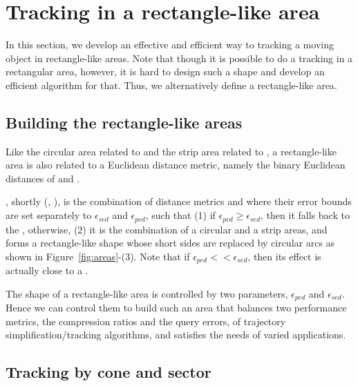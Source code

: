 

\section{Tracking in a rectangle-like area}
\label{sec:rectangle}

In this section, we develop an effective and efficient way to tracking a moving object in rectangle-like areas. Note that though it is possible to do a tracking in a rectangular area, however, it is hard to design such a shape and develop an efficient algorithm for that. Thus, we alternatively define a rectangle-like area.


\subsection{Building the rectangle-like areas}

Like the circular area related to \sed and the strip area related to \ped, a rectangle-like area is also related to a Euclidean distance metric, namely the binary Euclidean distances of \sed and \ped.

, shortly \bed (\sed, \ped), is the combination of distance metrics \sed and \ped where their error bounds are set separately to $\epsilon_{sed}$ and $\epsilon_{ped}$, such that (1) if $\epsilon_{ped} \ge \epsilon_{sed}$, then it falls back to the \sed, otherwise, (2) it is the combination of a circular and a strip areas, and forms a rectangle-like shape whose short sides are replaced by circular arcs as shown in {Figure~\ref{fig:areas}-(3)}. Note that if $\epsilon_{ped} << \epsilon_{sed}$, then its effect is actually close to a \ped.


The shape of a rectangle-like area is controlled by two parameters, $\epsilon_{ped}$ and $\epsilon_{sed}$. Hence we can control them to build such an area that balances two performance metrics, the compression ratios and the query errors, of trajectory simplification/tracking algorithms, and satisfies the needs of varied applications. 



\subsection{Tracking by cone and sector}

